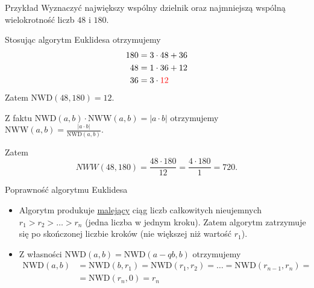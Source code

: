 \documentclass[a4paper,10pt]{beamer}
\begin{document}
\begin{frame}
	
	\begin{exampleblock}{Przykład}
		Wyznaczyć największy wspólny dzielnik oraz najmniejszą wspólną wielokrotność liczb $48$ i $180$.
		
		Stosując algorytm Euklidesa otrzymujemy
				\begin{align*}
			180&=3\cdot48+36\\
			48&=1\cdot36+12\\
			36&=3\cdot\textcolor{red}{12}
		\end{align*}
		Zatem $\mbox{NWD}(48,180)=12$.
		
		Z faktu $\mbox{NWD}(a,b)\cdot\mbox{NWW}(a,b)=|a\cdot b|$ otrzymujemy $\displaystyle\mbox{NWW}(a,b)=\frac{|a\cdot b|}{\mbox{NWD}(a,b)}$.
		
		Zatem $$NWW(48,180)=\frac{48\cdot180}{12}=\frac{4\cdot180}{1}=720.$$
		
	\end{exampleblock}

\end{frame}



\begin{frame}
	
	\begin{block}{Poprawność algorytmu Euklidesa}
		\begin{itemize}
			\item Algorytm produkuje \underline{malejący} ciąg liczb całkowitych nieujemnych $r_1>r_2>\ldots>r_n$ (jedna liczba w jednym kroku). Zatem algorytm zatrzymuje się po skończonej liczbie kroków (nie większej niż wartość $r_1$). 
			\item Z własności $\mbox{NWD}(a,b)=\mbox{NWD}(a-qb,b)$ otrzymujemy
			\begin{align*}
			\mbox{NWD}(a,b)&=\mbox{NWD}(b,r_1)=\mbox{NWD}(r_1,r_2)=\ldots=\mbox{NWD}(r_{n-1},r_n)=\\
			&=\mbox{NWD}(r_n,0)=r_n
			\end{align*}
		\end{itemize}
	\end{block}

\end{frame}
\end{document}
